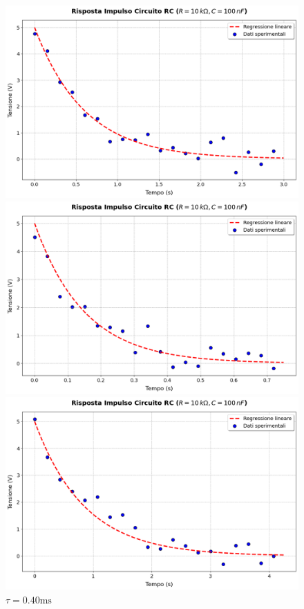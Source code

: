 \documentclass[a4paper,10pt]{article}
\begin{document}
\begin{figure}[htbp]
    \centering
    \begin{minipage}{0.32\textwidth}
        \centering
        \includegraphics[width=\linewidth]{assets/II/100.png}
        \caption{\(\tau = 0.95 \si{\milli\second}\)}
    \end{minipage}%
    \hfill
    \begin{minipage}{0.32\textwidth}
        \centering
        \includegraphics[width=\linewidth]{assets/II/50.png}
        \caption{\(\tau = 0.40 \si{\milli \second}\)}
    \end{minipage}%
    \hfill
    \begin{minipage}{0.32\textwidth}
        \centering
        \includegraphics[width=\linewidth]{assets/II/10.png}

\end{minipage}
\end{figure}
\end{document}
